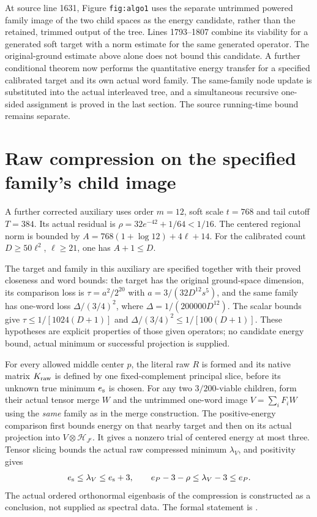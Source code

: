 \documentclass{article}
\begin{document}
At source line 1631, Figure \texttt{fig:algo1} uses the separate
untrimmed powered family image of the two child spaces as the energy
candidate, rather than the retained, trimmed output of the tree.
Lines 1793--1807 combine its viability for a generated soft target with
a norm estimate for the same generated operator. The original-ground estimate above alone does not bound this candidate.
A further conditional theorem now performs the quantitative energy
transfer for a specified calibrated target and its own actual word
family. The same-family node update is substituted into the actual
interleaved tree, and a simultaneous recursive one-sided assignment is
proved in the last section. The source running-time bound remains separate.

\section{Raw compression on the specified family's child image}

A further corrected auxiliary uses order $m=12$, soft scale $t=768$ and
tail cutoff $T=384$. Its actual residual is
$\rho=32e^{-42}+1/64<1/16$. The centered regional norm is bounded by
$A=768(1+\log12)+4\ell+14$. For the calibrated count
$D\ge50\ell^2$, $\ell\ge21$, one has $A+1\le D$.

The target and family in this auxiliary are specified together with
their proved closeness and word bounds: the target has the original
ground-space dimension, its comparison loss is
$\tau=a^2/2^{20}$ with $a=3/(32D^{12}s^5)$, and the same family has
one-word loss $\Delta/(3/4)^2$, where $\Delta=1/(200000D^{12})$.
The scalar bounds give
$\tau\le1/[1024(D+1)]$ and
$\Delta/(3/4)^2\le1/[100(D+1)]$. These hypotheses are explicit properties of those given operators;
no candidate energy bound, actual minimum or successful projection
is supplied.

For every allowed middle center $p$, the literal raw $R$ is formed and
its native matrix $K_{\rm raw}$ is defined by one fixed-complement
principal slice, before its unknown true minimum $e_{\rm s}$ is chosen.
For any two $3/200$-viable children, form their actual tensor merge $W$
and the untrimmed one-word image $V=\sum_iF_iW$ using the \emph{same}
family as in the merge construction. The positive-energy comparison first
bounds energy on that nearby target and then on its actual projection
into $V\otimes\mathcal H_{J^c}$. It gives a nonzero trial of centered
energy at most three. Tensor slicing bounds the actual raw compressed
minimum $\lambda_V$, and positivity gives
\begin{align}
 e_{\rm s}\le\lambda_V\le e_{\rm s}+3,\qquad
 e_P-3-\rho\le\lambda_V-3\le e_P.
\end{align}
The actual ordered orthonormal eigenbasis of the compression is
constructed as a conclusion, not supplied as spectral data. The formal
statement is
.
\end{document}
